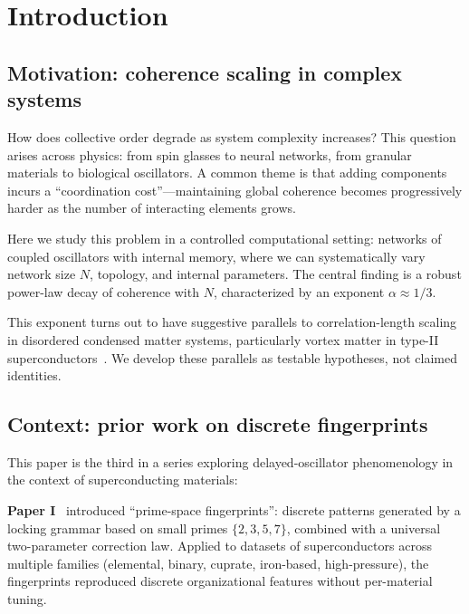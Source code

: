 \documentclass[reprint,aps,prb,superscriptaddress,floatfix]{revtex4-2}
\begin{document}
\maketitle

\section{Introduction}

\subsection{Motivation: coherence scaling in complex systems}

How does collective order degrade as system complexity increases? This question arises across physics: from spin glasses to neural networks, from granular materials to biological oscillators. A common theme is that adding components incurs a ``coordination cost''---maintaining global coherence becomes progressively harder as the number of interacting elements grows.

Here we study this problem in a controlled computational setting: networks of coupled oscillators with internal memory, where we can systematically vary network size $N$, topology, and internal parameters. The central finding is a robust power-law decay of coherence with $N$, characterized by an exponent $\alpha \approx 1/3$.

This exponent turns out to have suggestive parallels to correlation-length scaling in disordered condensed matter systems, particularly vortex matter in type-II superconductors~\cite{Blatter1994}. We develop these parallels as testable hypotheses, not claimed identities.

\subsection{Context: prior work on discrete fingerprints}

This paper is the third in a series exploring delayed-oscillator phenomenology in the context of superconducting materials:

\textbf{Paper I}~\cite{Agostino2025a} introduced ``prime-space fingerprints'': discrete patterns generated by a locking grammar based on small primes $\{2,3,5,7\}$, combined with a universal two-parameter correction law. Applied to datasets of superconductors across multiple families (elemental, binary, cuprate, iron-based, high-pressure), the fingerprints reproduced discrete organizational features without per-material tuning.
\end{document}
